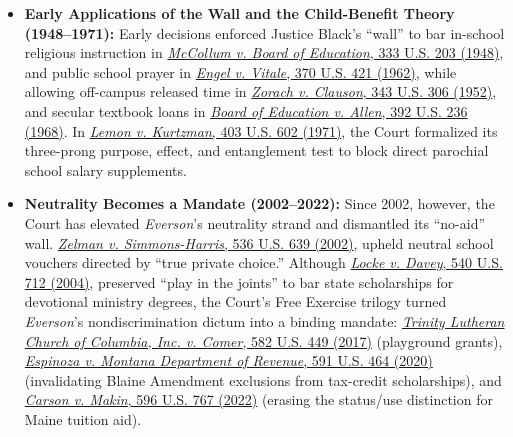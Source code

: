 \documentclass[12pt]{article}
\begin{document}
\begin{itemize}

\item \textbf{Early Applications of the Wall and the Child-Benefit Theory (1948--1971):} Early decisions enforced Justice Black's ``wall'' to bar in-school religious instruction in \href{https://supreme.justia.com/cases/federal/us/333/203/}{\emph{McCollum v. Board of Education}, 333 U.S. 203 (1948)}, and public school prayer in \href{https://supreme.justia.com/cases/federal/us/370/421/}{\emph{Engel v. Vitale}, 370 U.S. 421 (1962)}, while allowing off-campus released time in \href{https://supreme.justia.com/cases/federal/us/343/306/}{\emph{Zorach v. Clauson}, 343 U.S. 306 (1952)}, and secular textbook loans in \href{https://supreme.justia.com/cases/federal/us/392/236/}{\emph{Board of Education v. Allen}, 392 U.S. 236 (1968)}. In \href{https://supreme.justia.com/cases/federal/us/403/602/}{\emph{Lemon v. Kurtzman}, 403 U.S. 602 (1971)}, the Court formalized its three-prong purpose, effect, and entanglement test to block direct parochial school salary supplements.

\item \textbf{Neutrality Becomes a Mandate (2002--2022):} Since 2002, however, the Court has elevated \emph{Everson}'s neutrality strand and dismantled its ``no-aid'' wall. \href{https://supreme.justia.com/cases/federal/us/536/639/}{\emph{Zelman v. Simmons-Harris}, 536 U.S. 639 (2002)}, upheld neutral school vouchers directed by ``true private choice.'' Although \href{https://supreme.justia.com/cases/federal/us/540/712/}{\emph{Locke v. Davey}, 540 U.S. 712 (2004)}, preserved ``play in the joints'' to bar state scholarships for devotional ministry degrees, the Court's Free Exercise trilogy turned \emph{Everson}'s nondiscrimination dictum into a binding mandate: \href{https://supreme.justia.com/cases/federal/us/582/15-577/}{\emph{Trinity Lutheran Church of Columbia, Inc. v. Comer}, 582 U.S. 449 (2017)} (playground grants), \href{https://supreme.justia.com/cases/federal/us/591/18-1195/}{\emph{Espinoza v. Montana Department of Revenue}, 591 U.S. 464 (2020)} (invalidating Blaine Amendment exclusions from tax-credit scholarships), and \href{https://supreme.justia.com/cases/federal/us/596/20-1088/}{\emph{Carson v. Makin}, 596 U.S. 767 (2022)} (erasing the status/use distinction for Maine tuition aid).

\end{itemize}
\end{document}
